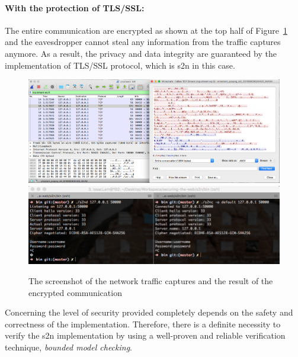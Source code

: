 \paragraph{With the protection of TLS/SSL:} The entire communication are encrypted as shown at the top half of Figure~\ref{fig:withtls} and the eavesdropper cannot steal any information from the traffic captures anymore. As a result, the privacy and data integrity are guaranteed by the implementation of TLS/SSL protocol, which is s2n in this case. 
\begin{figure}[hpt]
 \centering
    \includegraphics[width=\textwidth]{./contents/images/tls/swith.png}
    \includegraphics[width=\textwidth]{./contents/images/tls/twith.png}
    \caption{The screenshot of the network traffic captures and the result of the encrypted communication}
    \label{fig:withtls}
\end{figure}

Concerning the level of security provided completely depends on the safety and correctness of the implementation. Therefore, there is a definite necessity to verify the s2n implementation by using a well-proven and reliable verification technique, \textit{bounded model checking}.

